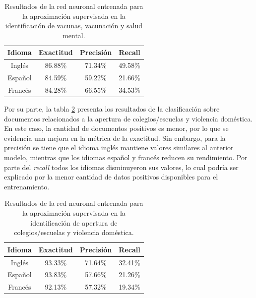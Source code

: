 \begin{table}[H]
    \centering
    \begin{tabular}{|c|c|c|c|}
        \textbf{Idioma} & \textbf{Exactitud} & \textbf{Precisión} & \textbf{Recall} \\ \hline
        Inglés & 86.88\% & 71.34\% & 49.58\% \\
        Español & 84.59\% & 59.22\% & 21.66\%  \\
        Francés & 84.28\% & 66.55\% & 34.53\% \\
    \end{tabular}
    \caption{Resultados de la red neuronal entrenada para la aproximación supervisada en la identificación de vacunas, vacunación y salud mental.}
    \label{tab:dc_supervised_metrics_2}
\end{table}

Por su parte, la tabla \ref{tab:dc_supervised_metrics_3} presenta los resultados de la clasificación sobre documentos relacionados a la apertura de colegios/escuelas y violencia doméstica. En este caso, la cantidad de documentos positivos es menor, por lo que se evidencia una mejora en la métrica de la exactitud. Sin embargo, para la precisión se tiene que el idioma inglés mantiene valores similares al anterior modelo, mientras que los idiomas español y francés reducen su rendimiento. Por parte del \textit{recall} todos los idiomas disminuyeron sus valores, lo cual podría ser explicado por la menor cantidad de datos positivos disponibles para el entrenamiento.

\begin{table}[H]
    \centering
    \begin{tabular}{|c|c|c|c|}
        \textbf{Idioma} & \textbf{Exactitud} & \textbf{Precisión} & \textbf{Recall} \\ \hline
        Inglés & 93.33\% & 71.64\% & 32.41\% \\
        Español & 93.83\% & 57.66\% & 21.26\% \\
        Francés & 92.13\% & 57.32\% & 19.34\% \\
    \end{tabular}
    \caption{Resultados de la red neuronal entrenada para la aproximación supervisada en la identificación de apertura de colegios/escuelas y violencia doméstica.}
    \label{tab:dc_supervised_metrics_3}
\end{table}

